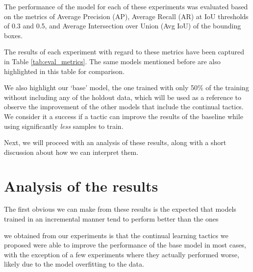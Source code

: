 \documentclass[../main.tex]{subfiles}
\begin{document}
The performance of the model for each of these experiments was evaluated based on the metrics of Average Precision (AP), Average Recall (AR) at IoU thresholds of 0.3 and 0.5, and Average Intersection over Union (Avg IoU) of the bounding boxes.

The results of each experiment with regard to these metrics have been captured in Table \ref{tab:eval_metrics}. The same models mentioned before are also highlighted in this table for comparison.

We also highlight our `base' model, the one trained with only 50\% of the training without including any of the holdout data, which will be used as a reference to observe the improvement of the other models that include the continual tactics. We consider it a success if a tactic can improve the results of the baseline while using significantly \textit{less} samples to train.


Next, we will proceed with an analysis of these results, along with a short discussion about how we can interpret them.


\section{Analysis of the results} \label{results:analysis}

The first obvious  we can make from these results is the expected that models trained in an incremental manner tend to perform better than the ones 

we obtained from our experiments is that the continual learning tactics we proposed were able to improve the performance of the base model in most cases, with the exception of a few experiments where they actually performed worse, likely due to the model overfitting to the data.



\end{document}
